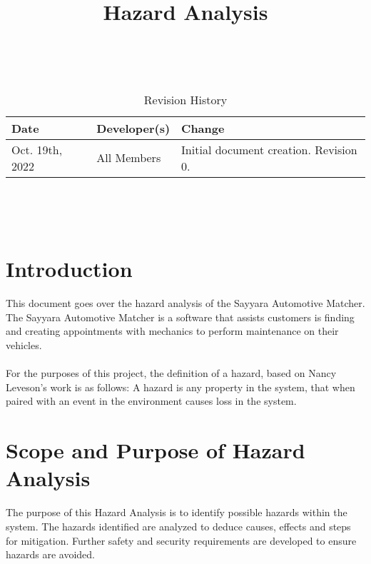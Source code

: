 \documentclass{article}
\title{Hazard Analysis\\\progname}
\author{\authname}
\date{}
\begin{document}
\maketitle
\thispagestyle{empty}

~\newpage


\begin{table}[hp]
\caption{Revision History} \label{TblRevisionHistory}
\begin{tabularx}{\textwidth}{llX}
\toprule
\textbf{Date} & \textbf{Developer(s)} & \textbf{Change}\\
\midrule
Oct. 19th, 2022 & All Members & Initial document creation. Revision 0.\\
\bottomrule
\end{tabularx}
\end{table}

~\newpage

\tableofcontents

~\newpage



\section{Introduction}

This document goes over the hazard analysis of the Sayyara Automotive Matcher. The Sayyara Automotive Matcher is a software that assists customers is finding and creating appointments with mechanics to perform maintenance on their vehicles.
\\\\
\noindent For the purposes of this project, the definition of a hazard, based on Nancy Leveson's work is as follows: A hazard is any property in the system, that when paired with an event in the environment causes loss in the system.

\section{Scope and Purpose of Hazard Analysis}

The purpose of this Hazard Analysis is to identify possible hazards within the system. The hazards identified are analyzed to deduce causes, effects and steps for mitigation. Further safety and security requirements are developed to ensure hazards are avoided.   
\end{document}
